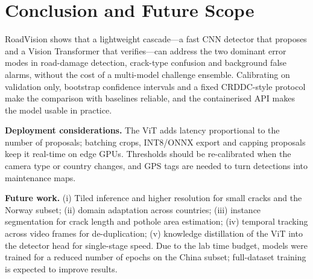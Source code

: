 \IfFileExists{IEEEtran.cls}{\documentclass[conference]{IEEEtran}}%
\begin{document}
\section{Conclusion and Future Scope}
RoadVision shows that a lightweight cascade---a fast CNN detector that proposes and a Vision Transformer that verifies---can address the two dominant error modes in road-damage detection, crack-type confusion and background false alarms, without the cost of a multi-model challenge ensemble. %
Calibrating on validation only, bootstrap confidence intervals and a fixed CRDDC-style protocol make the comparison with baselines reliable, and the containerised API makes the model usable in practice.

\textbf{Deployment considerations.} The ViT adds latency proportional to the number of proposals; batching crops, INT8/ONNX export and capping proposals keep it real-time on edge GPUs. Thresholds should be re-calibrated when the camera type or country changes, and GPS tags are needed to turn detections into maintenance maps.

\textbf{Future work.} (i) Tiled inference and higher resolution for small cracks and the Norway subset; (ii) domain adaptation across countries; (iii) instance segmentation for crack length and pothole area estimation; (iv) temporal tracking across video frames for de-duplication; (v) knowledge distillation of the ViT into the detector head for single-stage speed. Due to the lab time budget, models were trained for a reduced number of epochs on the China subset; full-dataset training is expected to improve results.
\end{document}

